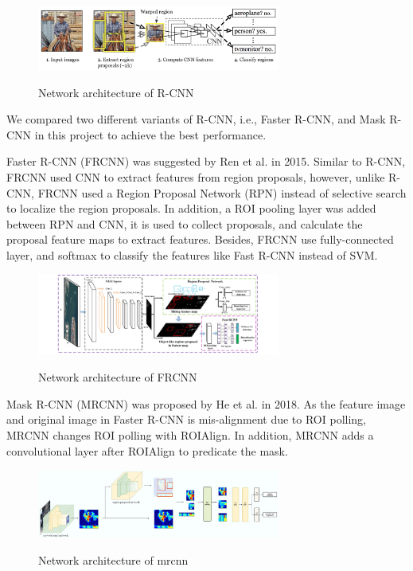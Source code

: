 \documentclass[runningheads]{llncs}
\begin{document}
\begin{figure}
    \centering
    \includegraphics[width=8cm]{reference/rcnn}
    \label{fig:example}
    \caption{Network architecture of R-CNN}
\end{figure}

We compared two different variants of R-CNN, i.e., 
Faster R-CNN, and Mask R-CNN in this project to achieve the 
best performance. 

Faster R-CNN\cite{FasterRCNN} (FRCNN) was suggested by Ren 
et al. in 2015. Similar to R-CNN, FRCNN used CNN to 
extract features from region proposals, however, unlike 
R-CNN, FRCNN used a Region Proposal Network (RPN) instead 
of selective search to localize the region proposals. In 
addition, a ROI pooling layer was added between RPN and 
CNN, it is used to collect proposals, and calculate the 
proposal feature maps to extract features. Besides, FRCNN 
use fully-connected layer, and softmax to classify the 
features like Fast R-CNN instead of SVM. 

\begin{figure}
    \centering
    \includegraphics[width=8cm]{reference/frcnn}
    \label{fig:example}
    \caption{Network architecture of FRCNN}
\end{figure}

Mask R-CNN\cite{MaskRCNN} (MRCNN) was proposed by He et al. 
in 2018. As the feature image and original image in Faster 
R-CNN is mis-alignment due to ROI polling, MRCNN changes ROI 
polling with ROIAlign. In addition, MRCNN adds a 
convolutional layer after ROIAlign to predicate the mask. 

\begin{figure}
    \centering
    \includegraphics[width=8cm]{reference/mrcnn}
    \label{fig:example}
    \caption{Network architecture of mrcnn}
\end{figure}
\end{document}
